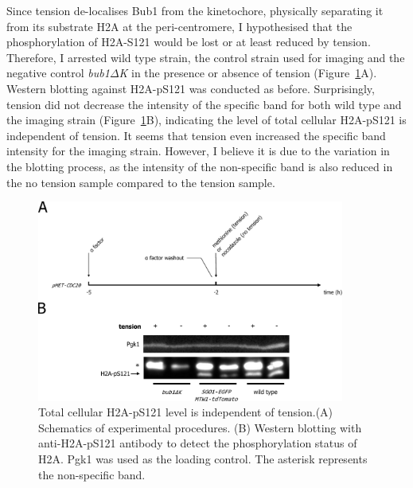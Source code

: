 Since tension de-localises Bub1 from the kinetochore, physically separating it from its substrate H2A at the peri-centromere, I hypothesised that the phosphorylation of H2A-S121 would be lost or at least reduced by tension. Therefore, I arrested wild type strain, the control strain used for imaging and the negative control \textit{bub1$\Delta$K} in the presence or absence of tension (Figure~\ref{fig:ph2atension}A). Western blotting against H2A-pS121 was conducted as before. Surprisingly, tension did not decrease the intensity of the specific band for both wild type and the imaging strain (Figure~\ref{fig:ph2atension}B), indicating the level of total cellular H2A-pS121 is independent of tension. It seems that tension even increased the specific band intensity for the imaging strain. However, I believe it is due to the variation in the blotting process, as the intensity of the non-specific band is also reduced in the no tension sample compared to the tension sample. 

\begin{figure}[htbp]
  \centering
  \includegraphics[width=0.9\textwidth]{chapter3/figures/pH2A tension.pdf}
  \caption[Total cellular H2A-pS121 level is independent of tension]{Total cellular H2A-pS121 level is independent of tension.(A) Schematics of experimental procedures. (B) Western blotting with anti-H2A-pS121 antibody to detect the phosphorylation status of H2A. Pgk1 was used as the loading control. The asterisk represents the non-specific band.}
  \label{fig:ph2atension}
\end{figure}

